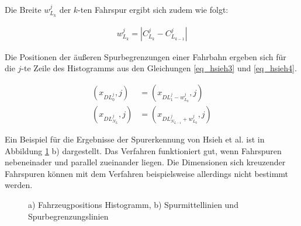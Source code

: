 Die Breite $w_{L_k}^{j}$ der $k$-ten Fahrspur ergibt sich zudem wie folgt:

\begin{ceqn}
\begin{align}
\label{eq_hsieh2}
    w_{L_k}^{j} = | C_{L_{k}}^{j} - C_{L_{k-1}}^{j} |
\end{align}
\end{ceqn}

Die Positionen der äußeren Spurbegrenzungen einer Fahrbahn ergeben sich für die $j$-te Zeile des Histogramms
aus den Gleichungen \ref{eq_hsieh3} und \ref{eq_hsieh4}.

\begin{ceqn}
\begin{align}
\label{eq_hsieh3}
    (x_{DL_0^j}, j) &= (x_{DL_1^j - w_{L_0}^j}, j) \\
\label{eq_hsieh4}
    (x_{DL_{N_L}^j}, j) &= (x_{DL_{N_{L-1}}^j + w_{L_0}^j}, j)
\end{align}
\end{ceqn}

Ein Beispiel für die Ergebnisse der Spurerkennung von Hsieh et al. ist in Abbildung \ref{fig:relw_hsieh_results} b) dargestellt.
Das Verfahren funktioniert gut, wenn Fahrspuren nebeneinader und parallel zueinander liegen. Die Dimensionen
sich kreuzender Fahrspuren können mit dem Verfahren beispielsweise allerdings nicht bestimmt werden.

\begin{figure}[H]
    \centering
    \caption[Ergebnisse Histogramm Erstellung und Spurextraktion (Hsieh et al.)]{a) Fahrzeugpositions Histogramm, b) Spurmittellinien und Spurbegrenzungslinien \cite[]{Hsieh2006}}
    \label{fig:relw_hsieh_results}
\end{figure}


